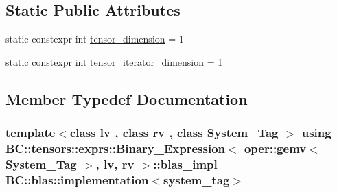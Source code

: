 \subsection*{Static Public Attributes}
\begin{DoxyCompactItemize}
\item 
static constexpr int \hyperlink{structBC_1_1tensors_1_1exprs_1_1Binary__Expression_3_01oper_1_1gemv_3_01System__Tag_01_4_00_01lv_00_01rv_01_4_aeb9702c2975240ee262ac614d9e643d1}{tensor\+\_\+dimension} = 1
\item 
static constexpr int \hyperlink{structBC_1_1tensors_1_1exprs_1_1Binary__Expression_3_01oper_1_1gemv_3_01System__Tag_01_4_00_01lv_00_01rv_01_4_a6cf1f09f15a9d2a8d612d689328b8dbc}{tensor\+\_\+iterator\+\_\+dimension} = 1
\end{DoxyCompactItemize}


\subsection{Member Typedef Documentation}
\subsubsection[{\texorpdfstring{blas\+\_\+impl}{blas_impl}}]{\setlength{\rightskip}{0pt plus 5cm}template$<$class lv , class rv , class System\+\_\+\+Tag $>$ using {\bf B\+C\+::tensors\+::exprs\+::\+Binary\+\_\+\+Expression}$<$ {\bf oper\+::gemv}$<$ System\+\_\+\+Tag $>$, lv, rv $>$\+::{\bf blas\+\_\+impl} =  B\+C\+::blas\+::implementation$<${\bf system\+\_\+tag}$>$}\hypertarget{structBC_1_1tensors_1_1exprs_1_1Binary__Expression_3_01oper_1_1gemv_3_01System__Tag_01_4_00_01lv_00_01rv_01_4_adefd9fb41ea7fe8d3620a716f4cf66c8}{}\label{structBC_1_1tensors_1_1exprs_1_1Binary__Expression_3_01oper_1_1gemv_3_01System__Tag_01_4_00_01lv_00_01rv_01_4_adefd9fb41ea7fe8d3620a716f4cf66c8}

